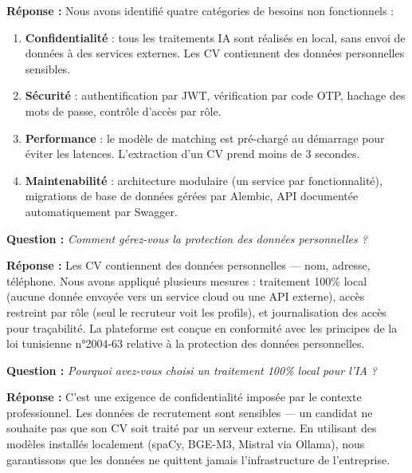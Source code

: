 \documentclass[12pt,a4paper]{article}
\newenvironment{jury}{%
  \def\FrameCommand{\fboxsep=8pt\colorbox{orange!12}}%
  \MakeFramed{\advance\hsize-\width \FrameRestore}%
  \vspace{-4pt}%
}{\endMakeFramed}
\newenvironment{reponse}{%
  \def\FrameCommand{\fboxsep=8pt\colorbox{green!10}}%
  \MakeFramed{\advance\hsize-\width \FrameRestore}%
  \vspace{-4pt}%
}{\endMakeFramed}
\newcommand{\Q}[1]{\vspace{6pt}\noindent\textbf{\color{orange}Question :} \textit{#1}}
\newcommand{\R}[1]{\noindent\textbf{\color{vert}Réponse :} #1\vspace{6pt}}
\begin{document}
\begin{reponse}
\R{Nous avons identifié quatre catégories de besoins non fonctionnels :
\begin{enumerate}[leftmargin=1.5cm]
  \item \textbf{Confidentialité} : tous les traitements IA sont réalisés en local, sans envoi de données à des services externes. Les CV contiennent des données personnelles sensibles.
  \item \textbf{Sécurité} : authentification par JWT, vérification par code OTP, hachage des mots de passe, contrôle d'accès par rôle.
  \item \textbf{Performance} : le modèle de matching est pré-chargé au démarrage pour éviter les latences. L'extraction d'un CV prend moins de 3 secondes.
  \item \textbf{Maintenabilité} : architecture modulaire (un service par fonctionnalité), migrations de base de données gérées par Alembic, API documentée automatiquement par Swagger.
\end{enumerate}}
\end{reponse}

\begin{jury}
\Q{Comment gérez-vous la protection des données personnelles ?}
\end{jury}

\begin{reponse}
\R{Les CV contiennent des données personnelles — nom, adresse, téléphone.
Nous avons appliqué plusieurs mesures : traitement 100\% local (aucune donnée envoyée vers un service cloud ou une API externe), accès restreint par rôle (seul le recruteur voit les profils), et journalisation des accès pour traçabilité.
La plateforme est conçue en conformité avec les principes de la loi tunisienne n°2004-63 relative à la protection des données personnelles.}
\end{reponse}

\begin{jury}
\Q{Pourquoi avez-vous choisi un traitement 100\% local pour l'IA ?}
\end{jury}

\begin{reponse}
\R{C'est une exigence de confidentialité imposée par le contexte professionnel.
Les données de recrutement sont sensibles — un candidat ne souhaite pas que son CV soit traité par un serveur externe.
En utilisant des modèles installés localement (spaCy, BGE-M3, Mistral via Ollama), nous garantissons que les données ne quittent jamais l'infrastructure de l'entreprise.}
\end{reponse}
\end{document}

